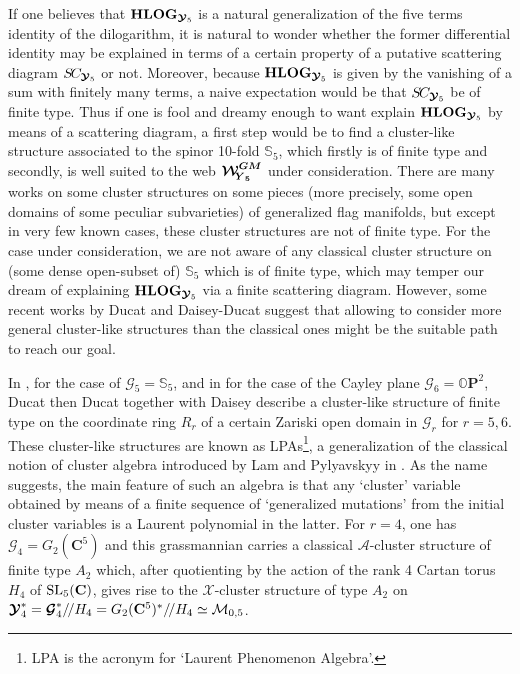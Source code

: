 \documentclass[11pt]{amsart}
\newcommand{\sk}{\smallskip}
\begin{document}
If one believes that ${\bf HLOG}_{\boldsymbol{\mathcal Y}_5}$ is a natural generalization of the five terms identity of the dilogarithm, it is natural to wonder whether the former differential identity may be explained in terms of a certain property of a putative scattering diagram $S\hspace{-0.05cm}C_{\boldsymbol{\mathcal Y}_5}$ or not. Moreover, because ${\bf HLOG}_{\boldsymbol{\mathcal Y}_5}$ is given by the vanishing of a sum with finitely many terms, a naive expectation would be that $S\hspace{-0.05cm}C_{\boldsymbol{\mathcal Y}_5}$ be of finite type. Thus if one is fool and dreamy enough to want explain ${\bf HLOG}_{\boldsymbol{\mathcal Y}_5}$ by means of a scattering diagram, a first step would be to find a cluster-like structure associated to the spinor 10-fold $\mathbb S_5$, which firstly is of finite type and secondly, is well suited to the web $\boldsymbol{\boldsymbol{\mathcal W}^{GM}_{\hspace{-0.1cm} \boldsymbol{Y}_5}}$ under consideration.  There are many works on some cluster structures on some  pieces  (more precisely, some open domains of some peculiar subvarieties) of generalized flag manifolds, but except in very few known cases, these cluster structures are not of finite type. For the case under consideration, we are not aware of any classical cluster structure on (some dense open-subset of) $\mathbb S_5$ which is of finite type, which  may temper our dream of explaining ${\bf HLOG}_{\boldsymbol{\mathcal Y}_5}$ via a finite scattering diagram. However, some recent works by Ducat and Daisey-Ducat suggest that allowing to consider more general cluster-like structures than the classical ones might be the suitable path to reach our goal. 
\sk

In \cite{Ducat}, for the case of $\boldsymbol{\mathcal G}_5=\mathbb S_5$, and in \cite{DaiseyDucat} for the case of the Cayley plane $\boldsymbol{\mathcal G}_6=\mathbb O\mathbf P^2$, Ducat then Ducat together with Daisey describe a cluster-like structure of finite type on the coordinate ring $R_r$  of a certain Zariski open domain in $\boldsymbol{\mathcal G}_r$ for $r=5,6$. These cluster-like structures are known as LPAs\footnote{LPA is the acronym for `Laurent Phenomenon Algebra'.}, a generalization of the classical notion of cluster algebra introduced by Lam and Pylyavskyy in \cite{LamPylyavskyy}.  As the name suggests, the main feature of such an  algebra is that any `cluster' variable obtained by means of a finite sequence of `generalized mutations' from the initial cluster variables is a Laurent polynomial in the latter.  For $r=4$, one has $\boldsymbol{\mathcal G}_4=G_2(\mathbf C^5)$
and this grassmannian carries a classical $\mathscr A$-cluster structure of finite type $A_2$ which, after quotienting by the action of the rank 4 Cartan torus $H_4$ of ${\rm SL}_5(\mathbf C)$, gives rise to the $\mathscr X$-cluster structure of type $A_2$ on $\boldsymbol{\mathcal Y}_4^*=\boldsymbol{\mathcal G}_4^*/\hspace{-0.05cm}/ H_4= 
G_2(\mathbf C^5)^*/\hspace{-0.05cm}/ H_4\simeq \mathcal M_{0,5}$. 
\sk
\end{document}
